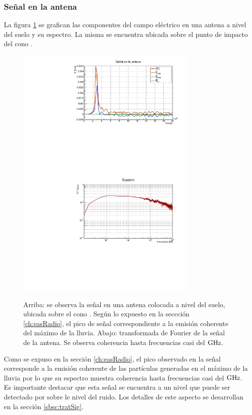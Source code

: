	\subsubsection{Señal en la antena}
	La figura \ref{fig:antSig} se grafican las componentes del campo eléctrico en una antena a nivel del suelo y su espectro. La misma se encuentra ubicada sobre el punto de impacto del cono \cher{}.
	\begin{figure}[ht!]
		\centering
		\includegraphics[width=0.8\textwidth]{./fig/simulacionRadio/antennaSignal}\\
		\includegraphics[width=0.8\textwidth]{./fig/simulacionRadio/antennaSpec}
		\caption{\label{fig:antSig}
		Arriba: se observa la señal en una antena colocada a nivel del suelo, ubicada sobre el cono \cher{}. Según lo expuesto en la seccción \ref{ch:easRadio}, el pico de señal correspondiente a la emisión coherente del máximo de la lluvia.
		Abajo: transformada de Fourier de la señal de la antena. Se observa coherencia hasta frecuencias casi del $\rm GHz$.
		}
	\end{figure}
	Como se expuso en la sección \ref{ch:easRadio}, el pico observado en la señal corresponde a la emisión coherente de las partículas generadas en el máximo de la lluvia por lo que su espectro muestra coherencia hasta frecuencias casi del $\rm GHz$.
	Es importante destacar que esta señal se encuentra a un nivel que puede ser detectado por sobre le nivel del ruido. 
	Los detalles de este aspecto se desarrollan en la sección \ref{sbsc:tratSig}.
	
